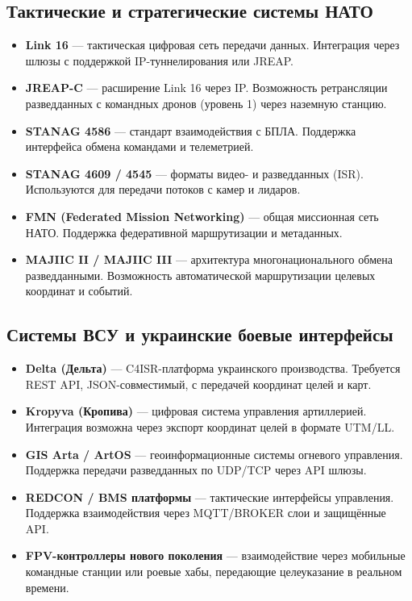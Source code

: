 \documentclass[12pt]{article}
\begin{document}
\subsection{Тактические и стратегические системы НАТО}
\begin{itemize}
    \item \textbf{Link 16} --- тактическая цифровая сеть передачи данных. Интеграция через шлюзы с поддержкой IP-туннелирования или JREAP.
    \item \textbf{JREAP-C} --- расширение Link 16 через IP. Возможность ретрансляции разведданных с командных дронов (уровень 1) через наземную станцию.
    \item \textbf{STANAG 4586} --- стандарт взаимодействия с БПЛА. Поддержка интерфейса обмена командами и телеметрией.
    \item \textbf{STANAG 4609 / 4545} --- форматы видео- и разведданных (ISR). Используются для передачи потоков с камер и лидаров.
    \item \textbf{FMN (Federated Mission Networking)} --- общая миссионная сеть НАТО. Поддержка федеративной маршрутизации и метаданных.
    \item \textbf{MAJIIC II / MAJIIC III} --- архитектура многонационального обмена разведданными. Возможность автоматической маршрутизации целевых координат и событий.
\end{itemize}

\subsection{Системы ВСУ и украинские боевые интерфейсы}
\begin{itemize}
    \item \textbf{Delta (Дельта)} --- C4ISR-платформа украинского производства. Требуется REST API, JSON-совместимый, с передачей координат целей и карт.
    \item \textbf{Kropyva (Кропива)} --- цифровая система управления артиллерией. Интеграция возможна через экспорт координат целей в формате UTM/LL.
    \item \textbf{GIS Arta / ArtOS} --- геоинформационные системы огневого управления. Поддержка передачи разведданных по UDP/TCP через API шлюзы.
    \item \textbf{REDCON / BMS платформы} --- тактические интерфейсы управления. Поддержка взаимодействия через MQTT/BROKER слои и защищённые API.
    \item \textbf{FPV-контроллеры нового поколения} --- взаимодействие через мобильные командные станции или роевые хабы, передающие целеуказание в реальном времени.
\end{itemize}
\end{document}

